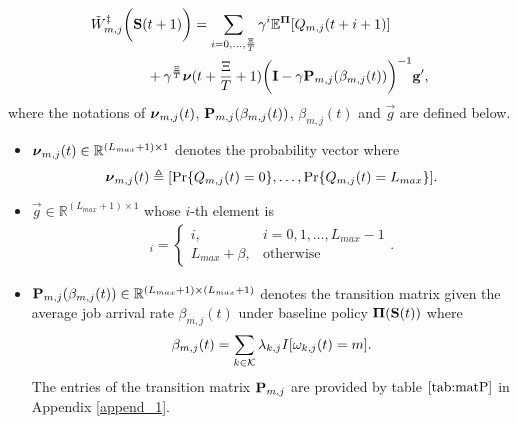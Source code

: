 \begin{lemma}
    {\small
    \begin{align}
        &\tilde{W}^{\ddagger}_{m,j}\bigg(\mathbf{S}(t+1)\bigg)
        = \sum_{i=0,\dots,\frac{\Xi}{T}} \gamma^{i} \mathbb{E}^{\boldsymbol{\Pi}}[ Q_{m,j}({t+i+1}) ]
        \nonumber\\
        &~~~~~~~~~~~~+ \gamma^{\frac{\Xi}{T}} 
        \boldsymbol{\nu}({t+\frac{\Xi}{T}+1})
        \bigg(
            \mathbf{I} - \gamma \mathbf{P}_{m,j}(\beta_{m,j}(t))
        \bigg)^{-1} \mathbf{g}',
        \label{w_es}
    \end{align}   
    }
    where the notations of $\boldsymbol{\nu}_{m,j}(t)$, $\mathbf{P}_{m,j}(\beta_{m,j}(t))$, $\beta_{m,j}(t)$ and $\vec{g}$ are defined below.
    \begin{itemize}
        \item $\boldsymbol{\nu}_{m,j}(t) \in \mathbb{R}^{(L_{max}+1) \times 1}$ denotes the probability vector where
        \begin{align}
            \boldsymbol{\nu}_{m,j}(t) \triangleq [\Pr\{Q_{m,j}(t)=0\}, \dots, \Pr\{Q_{m,j}(t)=L_{max}\}].
        \end{align}

        \item $\vec{g} \in \mathbb{R}^{(L_{max}+1) \times 1}$ whose $i$-th element is
        \begin{align}
            [\vec{g}]_{i} = 
            \begin{cases}
                i, & i=0,1,\dots,L_{max}-1
                \\
                L_{max}+\beta, & \text{otherwise}
            \end{cases}.
        \end{align}

        \item $\mathbf{P}_{m,j}(\beta_{m,j}(t)) \in \mathbb{R}^{(L_{max}+1) \times (L_{max}+1)}$ denotes the transition matrix given the average job arrival rate $\beta_{m,j}(t)$ under baseline policy $\boldsymbol{\Pi}(\mathbf{S}(t))$ where
        \begin{align}
            \beta_{m,j}(t) = \sum_{k\in\mathcal{K}} \lambda_{k,j} I[\omega_{k,j}(t)=m].
        \end{align}
        The entries of the transition matrix $\mathbf{P}_{m,j}$ are provided by table $\ref{tab:matP}$ in Appendix \ref{append_1}.
    \end{itemize}

\end{lemma}

